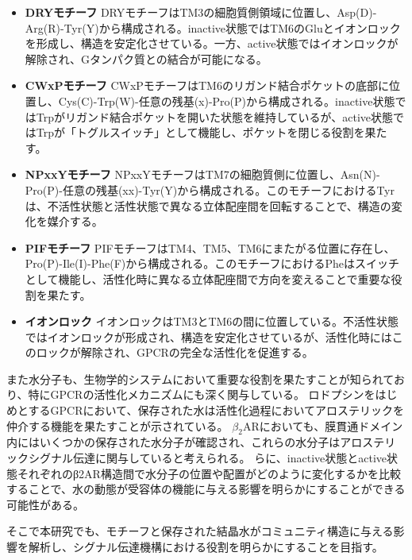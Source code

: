 \begin{itemize}
  \item \textbf{DRYモチーフ}  
  DRYモチーフはTM3の細胞質側領域に位置し、Asp(D)-Arg(R)-Tyr(Y)から構成される。inactive状態ではTM6のGluとイオンロックを形成し、構造を安定化させている。一方、active状態ではイオンロックが解除され、Gタンパク質との結合が可能になる。

  \item \textbf{CWxPモチーフ}  
  CWxPモチーフはTM6のリガンド結合ポケットの底部に位置し、Cys(C)-Trp(W)-任意の残基(x)-Pro(P)から構成される。inactive状態ではTrpがリガンド結合ポケットを開いた状態を維持しているが、active状態ではTrpが「トグルスイッチ」として機能し、ポケットを閉じる役割を果たす。

  \item \textbf{NPxxYモチーフ}  
  NPxxYモチーフはTM7の細胞質側に位置し、Asn(N)-Pro(P)-任意の残基(xx)-Tyr(Y)から構成される。このモチーフにおけるTyrは、不活性状態と活性状態で異なる立体配座間を回転することで、構造の変化を媒介する。

  \item \textbf{PIFモチーフ}  
  PIFモチーフはTM4、TM5、TM6にまたがる位置に存在し、Pro(P)-Ile(I)-Phe(F)から構成される。このモチーフにおけるPheはスイッチとして機能し、活性化時に異なる立体配座間で方向を変えることで重要な役割を果たす。

  \item \textbf{イオンロック}  
  イオンロックはTM3とTM6の間に位置している。不活性状態ではイオンロックが形成され、構造を安定化させているが、活性化時にはこのロックが解除され、GPCRの完全な活性化を促進する。
\end{itemize}


また水分子も、生物学的システムにおいて重要な役割を果たすことが知られており、特にGPCRの活性化メカニズムにも深く関与している。
ロドプシンをはじめとするGPCRにおいて、保存された水は活性化過程においてアロステリックを仲介する機能を果たすことが示されている\cite{angel2009conserved}。
$\beta_2$ARにおいても、膜貫通ドメイン内にはいくつかの保存された水分子が確認され、これらの水分子はアロステリックシグナル伝達に関与していると考えられる。
らに、inactive状態とactive状態それぞれのβ2AR構造間で水分子の位置や配置がどのように変化するかを比較することで、水の動態が受容体の機能に与える影響を明らかにすることができる可能性がある。

そこで本研究でも、モチーフと保存された結晶水がコミュニティ構造に与える影響を解析し、シグナル伝達機構における役割を明らかにすることを目指す。
